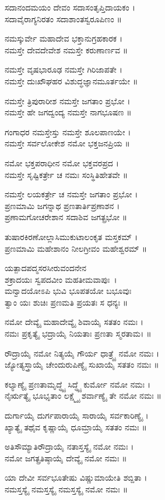 ಸದಾನಂದಮಯಂ ದೇವಂ ಸದಾಸಂತೃಪ್ತಿದಾಯಕಂ ।\\ಸದಾವೈರಾಗ್ಯನಿರತಂ ಸದಾಶಾಂತಸ್ವರೂಪಿಣಂ ॥

ನಮಸ್ಕುರ್ವೇ ಮಹಾದೇವ ಭಕ್ತಾನುಗ್ರಹಕಾರಕ ।\\ ನಮಸ್ತೇ ದೇವದೇವೇಶ ನಮಸ್ತೇ ಕರುಣಾರ್ಣವ ॥

ನಮಸ್ತೇ ವೃಷಭಾರೂಢ ನಮಸ್ತೇ ಗಿರಿಜಾಪತೇ ।\\ನಮಸ್ತೇ ದುಃಖೌಘಹರ ವಿಶುದ್ಧಜ್ಞಾನಮೂರ್ತಯೇ ॥

ನಮಸ್ತೇ ತ್ರಿಪುರಾರೀಶ ನಮಸ್ತೇ ಜಗತಾಂ ಪ್ರಭೋ ।\\ ನಮಸ್ತೇ ಹೇ ಜಗದ್ವಂದ್ಯ ನಮಸ್ತೇ ನಾಗಭೂಷಣ ॥

ಗಂಗಾಧರ ನಮಸ್ತೇಸ್ತು  ನಮಸ್ತೇ ಶೂಲಪಾಣಯೇ ।\\ ನಮಸ್ತೇ ಸರ್ವಲೋಕೇಶ ನಮೋ ಭಕ್ತಜನಪ್ರಿಯ ॥

ನಮೋ ಭಕ್ತಪರಾಧೀನ ನಮೋ ಭಕ್ತವರಪ್ರದ ।\\ ನಮಸ್ತೇ ಸೃಷ್ಟಿಕರ್ತ್ರೇ ಚ ನಮಃ ಸಂಸ್ಥಿತಿಹೇತವೇ ॥

ನಮಸ್ತೇ ಲಯಕರ್ತ್ರೇ ಚ ನಮಸ್ತೇ ಜಗತಾಂ ಪ್ರಭೋ ।\\
ಪ್ರಣಮಾಮಿ ಜಗನ್ನಾಥ ಪ್ರಣತಾರ್ತಿಪ್ರಣಾಶನ ।\\ಪ್ರಣಾಮಗೋಚರೇಶಾನ ಸದಾಶಿವ ಜಗತ್ಪ್ರಭೋ ॥

ತುಷಾರಕಿರಣೋಲ್ಲಾಸಿಮುಕುಟಾಲಂಕೃತ ಮಸ್ತಕಮ್ ।\\ಪ್ರಣಮಾಮಿ ಮಹೇಶಾನಂ ನೀಲಗ್ರೀವಂ ಮಹೇಶ್ವರಮ್ ॥

ಯತ್ಪಾದಪದ್ಮಸರಸೀರುವಂದನೇನ \\ಶಕ್ರಾದಯಃ ಸ್ವಪದವೀಂ ಮಹತೀಮವಾಪುಃ~।\\
ಮನ್ವಾದಯೋಽಪಿ ಭುವಿ ಭೂಪತಯೋ ಬಭೂವುಃ\\ತ್ವಾಂ ಯಃ ಶುಚಿಃ ಪ್ರಣಮತಿ ಪ್ರಯತಃ ಸ ಧನ್ಯಃ ॥

ನಮೋ ದೇವ್ಯೈ ಮಹಾದೇವ್ಯೈ ಶಿವಾಯೈ ಸತತಂ ನಮಃ ।\\
ನಮಃ ಪ್ರಕೃತ್ಯೈ ಭದ್ರಾಯೈ ನಿಯತಾಃ ಪ್ರಣತಾ ಸ್ಮರತಾಮ। ॥

ರೌದ್ರಾಯೈ ನಮೋ ನಿತ್ಯಯೈ ಗೌರ್ಯ ಧಾತ್ರ್ಯೈ ನಮೋ ನಮಃ ।\\
ಜ್ಯೋತ್ಯಸ್ತ್ರಾಯೈ ಚೇಂದುರುಪಿಣ್ಯೈ ಸುಖಾಯೈ ಸತತಂ ನಮಃ ॥

ಕಲ್ಯಾಣ್ಯೈ ಪ್ರಣತಾಮೃದ್ಧ್ಯೈ ಸಿದ್ಧ್ಯೈ ಕುರ್ಮೋ ನಮೋ ನಮಃ ।\\
ನೈರ್ಋತ್ಯೈ ಭೂಭೃತಾಂ ಲಕ್ಷ್ಮ್ಯೈ ಶರ್ವಾಣ್ಯೈ ತೇ ನಮೋ ನಮಃ ॥

ದುರ್ಗಾಯೈ ದುರ್ಗಪಾರಾಯೈ ಸಾರಾಯೈ ಸರ್ವಕಾರಿಣ್ಯೈ ।\\
ಖ್ಯಾತ್ಯೈ ತಥೈವ ಕೃಷ್ಣಾಯೈ ಧೂಮ್ರಾಯೈ ಸತತಂ ನಮಃ ॥

ಅತಿಸೌಮ್ಯಾತಿರೌದ್ರಾಯೈ ನತಾಸ್ತಸ್ಯೈ ನಮೋ ನಮಃ ।\\
ನಮೋ ಜಗತ್ಪ್ರತಿಷ್ಠಾಯೈ ದೇವ್ಯೈ ನಮೋ ನಮಃ ॥

ಯಾ ದೇವೀ ಸರ್ವಭೂತೇಷು ವಿಷ್ಣುಮಾಯೇತಿ ಶಬ್ದಿತಾ ।\\
ನಮಸ್ತಸ್ಯೈ ನಮಸ್ತಸ್ಯೈ ನಮಸ್ತಸ್ಯೈ ನಮೋ ನಮಃ ॥

